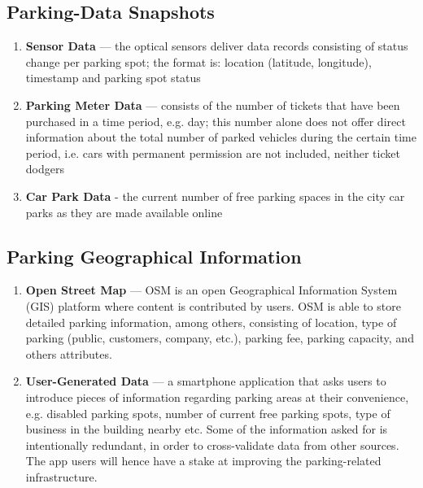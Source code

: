 \documentclass{article}
\begin{document}
\subsection{Parking-Data Snapshots}
\label{parking-data-snapshots}
\begin{enumerate}
\item \textbf{Sensor Data} --- the optical sensors deliver data records consisting of status change per parking spot; the format is: location (latitude, longitude), timestamp and parking spot status
\item \textbf{Parking Meter Data} --- consists of the number of tickets that have been purchased in a time period, e.g. day; this number alone does not offer direct information about the total number of parked vehicles during the certain time period, i.e. cars with permanent permission are not included, neither ticket dodgers
\item \textbf{Car Park Data} - the current number of free parking spaces in the city car parks as they are made available online
\end{enumerate}

\subsection{Parking Geographical Information}
\label{parking-geo-info}
\begin{enumerate}
\item \textbf{Open Street Map} --- OSM is an open Geographical Information System (GIS) platform where content is contributed by users. OSM is able to store detailed parking information, among others, consisting of location, type of parking (public, customers, company, etc.), parking fee, parking capacity, and others attributes.
\item \textbf{User-Generated Data} --- a smartphone application that asks users to introduce pieces of information regarding parking areas at their convenience, e.g. disabled parking spots, number of current free parking spots, type of business in the building nearby etc. Some of the information asked for is intentionally redundant, in order to cross-validate data from other sources. The app users will hence have a stake at improving the parking-related infrastructure. 
\end{enumerate}
\end{document}
